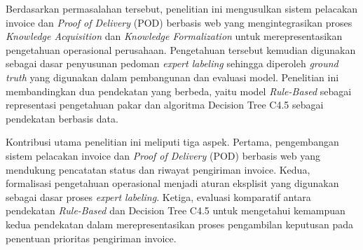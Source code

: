 Berdasarkan permasalahan tersebut, penelitian ini mengusulkan sistem pelacakan invoice dan \textit{Proof of Delivery} (POD) berbasis web yang mengintegrasikan proses \textit{Knowledge Acquisition} dan \textit{Knowledge Formalization} untuk merepresentasikan pengetahuan operasional perusahaan. Pengetahuan tersebut kemudian digunakan sebagai dasar penyusunan pedoman \textit{expert labeling} sehingga diperoleh \textit{ground truth} yang digunakan dalam pembangunan dan evaluasi model. Penelitian ini membandingkan dua pendekatan yang berbeda, yaitu model \textit{Rule-Based} sebagai representasi pengetahuan pakar dan algoritma Decision Tree C4.5 sebagai pendekatan berbasis data.

Kontribusi utama penelitian ini meliputi tiga aspek. Pertama, pengembangan sistem pelacakan invoice dan \textit{Proof of Delivery} (POD) berbasis web yang mendukung pencatatan status dan riwayat pengiriman invoice. Kedua, formalisasi pengetahuan operasional menjadi aturan eksplisit yang digunakan sebagai dasar proses \textit{expert labeling}. Ketiga, evaluasi komparatif antara pendekatan \textit{Rule-Based} dan Decision Tree C4.5 untuk mengetahui kemampuan kedua pendekatan dalam merepresentasikan proses pengambilan keputusan pada penentuan prioritas pengiriman invoice.


